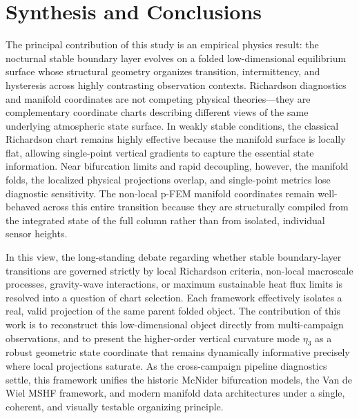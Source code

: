 \documentclass[12pt,a4paper]{article}
\begin{document}
\section{Synthesis and Conclusions}

The principal contribution of this study is an empirical physics result: the nocturnal stable boundary layer evolves on a folded low-dimensional equilibrium surface whose structural geometry organizes transition, intermittency, and hysteresis across highly contrasting observation contexts. Richardson diagnostics and manifold coordinates are not competing physical theories---they are complementary coordinate charts describing different views of the same underlying atmospheric state surface. In weakly stable conditions, the classical Richardson chart remains highly effective because the manifold surface is locally flat, allowing single-point vertical gradients to capture the essential state information. Near bifurcation limits and rapid decoupling, however, the manifold folds, the localized physical projections overlap, and single-point metrics lose diagnostic sensitivity. The non-local p-FEM manifold coordinates remain well-behaved across this entire transition because they are structurally compiled from the integrated state of the full column rather than from isolated, individual sensor heights.

In this view, the long-standing debate regarding whether stable boundary-layer transitions are governed strictly by local Richardson criteria, non-local macroscale processes, gravity-wave interactions, or maximum sustainable heat flux limits is resolved into a question of chart selection. Each framework effectively isolates a real, valid projection of the same parent folded object. The contribution of this work is to reconstruct this low-dimensional object directly from multi-campaign observations, and to present the higher-order vertical curvature mode $\eta_3$ as a robust geometric state coordinate that remains dynamically informative precisely where local projections saturate. As the cross-campaign pipeline diagnostics settle, this framework unifies the historic McNider bifurcation models, the Van de Wiel MSHF framework, and modern manifold data architectures under a single, coherent, and visually testable organizing principle.



\end{document}
